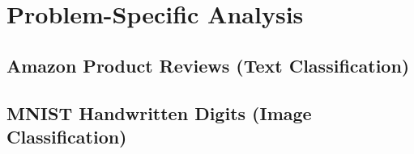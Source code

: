\section{Problem-Specific Analysis}

\subsection{Amazon Product Reviews (Text Classification)}

\subsection{MNIST Handwritten Digits (Image Classification)}